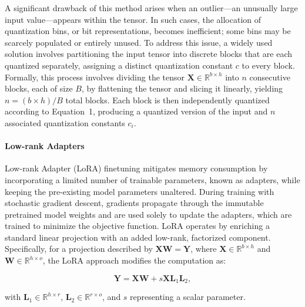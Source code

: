 A significant drawback of this method arises when an outlier—an unusually large input value—appears within the tensor. In such cases, the allocation of quantization bins, or bit representations, becomes inefficient; some bins may be scarcely populated or entirely unused. To address this issue, a widely used solution involves partitioning the input tensor into discrete blocks that are each quantized separately, assigning a distinct quantization constant $c$ to every block. Formally, this process involves dividing the tensor $\mathbf{X}\in \mathbb{R}^{b\times h}$ into $n$ consecutive blocks, each of size $B$, by flattening the tensor and slicing it linearly, yielding ${n = ({b\times h} )/{B} }$ total blocks. Each block is then independently quantized according to Equation~1, producing a quantized version of the input and $n$ associated quantization constants $c_i$.

\paragraph{Low-rank Adapters} Low-rank Adapter (LoRA) finetuning \citep{hu2021lora} mitigates memory consumption by incorporating a limited number of trainable parameters, known as adapters, while keeping the pre-existing model parameters unaltered. During training with stochastic gradient descent, gradients propagate through the immutable pretrained model weights and are used solely to update the adapters, which are trained to minimize the objective function. LoRA operates by enriching a standard linear projection with an added low-rank, factorized component. Specifically, for a projection described by ${\mathbf{X} \mathbf{W} = \mathbf{Y}}$, where $\mathbf{X}\in  \mathbb{R}^{b\times h}$ and $\mathbf{W}\in  \mathbb{R}^{h\times o}$, the LoRA approach modifies the computation as:

\begin{equation}
    \mathbf{Y} = \mathbf{X}\mathbf{W} + s\mathbf{X}\mathbf{L}_1\mathbf{L}_2,
\end{equation}

with $\mathbf{L}_1\in  \mathbb{R}^{h\times r}$, $\mathbf{L}_2\in  \mathbb{R}^{r\times o}$, and $s$ representing a scalar parameter.

